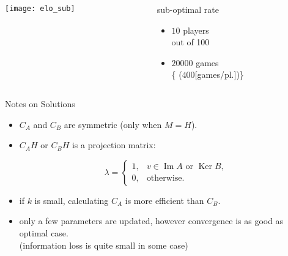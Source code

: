 \documentclass[fleqn,aspectratio=1610]{beamer}
\begin{document}
\begin{frame}[label={sec:org55ec833}]{}
\begin{columns}
\begin{column}{0.65\columnwidth}
\begin{center}
  \texttt{[image: elo\_sub]}%
\end{center}
\end{column}
\begin{column}{0.35\columnwidth}
sub-optimal rate
\begin{itemize}
\item \(10\) players\\
out of 100
\item \(20000\) games\\
\{\small
(\(400\){[}games/pl.])\}
\end{itemize}
\end{column}
\end{columns}
\end{frame}
\begin{frame}[label={sec:org8ee1b60}]{Notes on Solutions}
\begin{itemize}
\item \(C_{A}\) and \(C_{B}\) are symmetric (only when \(M=H\)).
\item \(C_{A}H\) or \(C_{B}H\) is a projection matrix:

\begin{equation}
  \lambda
  =
  \begin{cases}
    1,& v\in\operatorname{Im}A\text{ or }\operatorname{Ker}B,\\
    0,& \text{otherwise}.
  \end{cases}
\end{equation}
\item if \(k\) is small, calculating \(C_{A}\) is more efficient than \(C_{B}\).
\item only a few parameters are updated, however convergence is as
good as optimal case.\\
(information loss is quite small in some case)
\end{itemize}
\end{frame}
\end{document}
